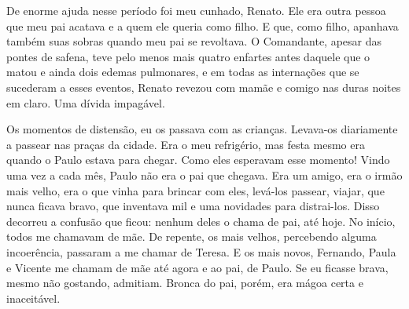De enorme ajuda nesse período foi meu cunhado, Renato.
Ele era outra pessoa que meu pai acatava e a quem ele queria como filho.
E que, como filho, apanhava também suas sobras quando meu pai se revoltava.
O Comandante, apesar das pontes de safena, teve pelo menos mais quatro enfartes antes daquele que o matou e ainda dois edemas pulmonares, e em todas as internações que se sucederam a esses eventos, Renato revezou com mamãe e comigo nas duras noites em claro.
Uma dívida impagável.


Os momentos de distensão, eu os passava com as crianças.
Levava-os diariamente a passear nas praças da cidade.
Era o meu refrigério, mas festa mesmo era quando o Paulo estava para chegar.
Como eles esperavam esse momento! Vindo uma vez a cada mês, Paulo não era o pai que chegava.
Era um amigo, era o irmão mais velho, era o que vinha para brincar com eles, levá-los passear, viajar, que nunca ficava bravo, que inventava mil e uma novidades para distrai-los.
Disso decorreu a confusão que ficou: nenhum deles o chama de pai, até hoje.
No início, todos me chamavam de mãe.
De repente, os mais velhos, percebendo alguma incoerência, passaram a me chamar de Teresa.
E os mais novos, Fernando, Paula e Vicente me chamam de mãe até agora e ao pai, de Paulo.
Se eu ficasse brava, mesmo não gostando, admitiam.
Bronca do pai, porém, era mágoa certa e inaceitável.
